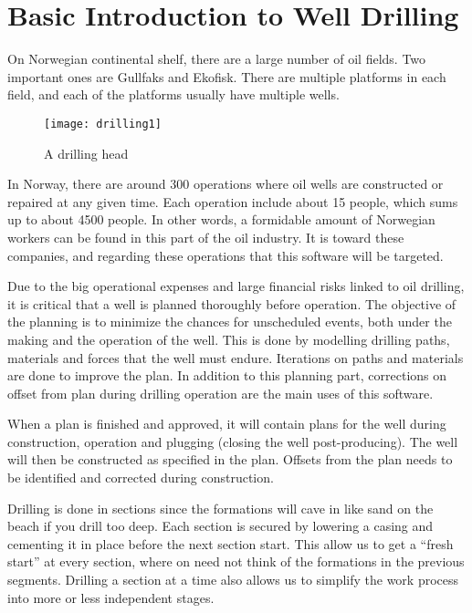 \documentclass{report}
\begin{document}
\newpage
\section{Basic Introduction to Well Drilling} \label{sec:basic_introduction_to_well_drilling}
On Norwegian continental shelf, there are a large number of oil fields. Two important ones are Gullfaks and Ekofisk. There are multiple platforms in each field, and each of the platforms usually have multiple wells.


\begin{wrapfigure}{R}{0.5\textwidth}
    \centering
    \texttt{[image: drilling1]}
    \caption{A drilling head \label{fig:drillinghead}}
\end{wrapfigure}

In Norway, there are around 300 operations where oil wells are constructed or repaired at any given time. Each operation include about 15 people, which sums up to about 4500 people. In other words, a formidable amount of Norwegian workers can be found in this part of the oil industry. It is toward these companies, and regarding these operations that this software will be targeted.

Due to the big operational expenses and large financial risks linked to oil drilling, it is critical that a well is planned thoroughly before operation. The objective of the planning is to minimize the chances for unscheduled events, both under the making and the operation of the well. This is done by modelling drilling paths, materials and forces that the well must endure. Iterations on paths and materials are done to improve the plan. In addition to this planning part, corrections on offset from plan during drilling operation are the main uses of this software.

When a plan is finished and approved, it will contain plans for the well during construction, operation and plugging (closing the well post-producing). The well will then be constructed as specified in the plan. Offsets from the plan needs to be identified and corrected during construction.

Drilling is done in sections since the formations will cave in like sand on the beach if you drill too deep. Each section is secured by lowering a casing and cementing it in place before the next section start. This allow us to get a “fresh start” at every section, where on need not think of the formations in the previous segments. Drilling a section at a time also allows us to simplify the work process into more or less independent stages.
\end{document}
